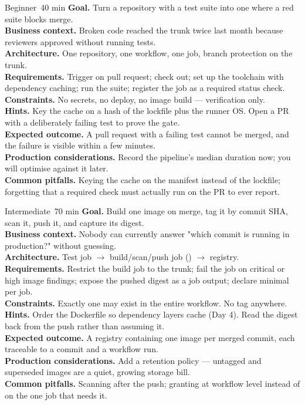 \begin{minilab}{Beginner}{~40 min}
\textbf{Goal.} Turn a repository with a test suite into one where a red suite blocks merge.\\
\textbf{Business context.} Broken code reached the trunk twice last month because reviewers approved without running tests.\\
\textbf{Architecture.} One repository, one workflow, one job, branch protection on the trunk.\\
\textbf{Requirements.} Trigger on pull request; check out; set up the toolchain with dependency caching; run the suite; register the job as a required status check.\\
\textbf{Constraints.} No secrets, no deploy, no image build --- verification only.\\
\textbf{Hints.} Key the cache on a hash of the lockfile plus the runner OS. Open a PR with a deliberately failing test to prove the gate.\\
\textbf{Expected outcome.} A pull request with a failing test cannot be merged, and the failure is visible within a few minutes.\\
\textbf{Production considerations.} Record the pipeline's median duration now; you will optimise against it later.\\
\textbf{Common pitfalls.} Keying the cache on the manifest instead of the lockfile; forgetting that a required check must actually run on the PR to ever report.
\end{minilab}

\begin{minilab}{Intermediate}{~70 min}
\textbf{Goal.} Build one image on merge, tag it by commit SHA, scan it, push it, and capture its digest.\\
\textbf{Business context.} Nobody can currently answer "which commit is running in production?" without guessing.\\
\textbf{Architecture.} Test job $\rightarrow$ build/scan/push job () $\rightarrow$ registry.\\
\textbf{Requirements.} Restrict the build job to the trunk; fail the job on critical or high image findings; expose the pushed digest as a job output; declare minimal  per job.\\
\textbf{Constraints.} Exactly one  may exist in the entire workflow. No  tag anywhere.\\
\textbf{Hints.} Order the Dockerfile so dependency layers cache (Day 4). Read the digest back from the push rather than assuming it.\\
\textbf{Expected outcome.} A registry containing one image per merged commit, each traceable to a commit and a workflow run.\\
\textbf{Production considerations.} Add a retention policy --- untagged and superseded images are a quiet, growing storage bill.\\
\textbf{Common pitfalls.} Scanning after the push; granting  at workflow level instead of on the one job that needs it.
\end{minilab}

